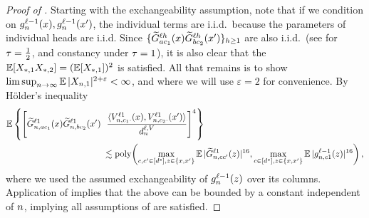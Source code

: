 \begin{proof}[Proof of ]
Starting with the exchangeability assumption, note that if we condition on ${g}^{\ell - 1}_{n}{(x)}, {g}^{\ell - 1}_{n}{(x')}$, the individual terms are i.i.d.\ because the parameters of individual heads are i.i.d.
Since $\{\widetilde{G}_{a c_1}^{\ell h} (x) \widetilde{G}_{b c_2}^{\ell h} (x')\}_{h \geq 1}$ are also i.i.d.\ (see  for $\tau  = \frac{1}{2}$, and constancy under $\tau = 1$), it is also clear that the $\operatorname*{\mathbb{E}} [ X_{*, 1} X_{*, 2} ] = (\operatorname*{\mathbb{E}} [X_{*, 1}])^2$ is satisfied.
All that remains is to show $\limsup_{n \to \infty} \operatorname*{\mathbb{E}} | X_{n, 1} |^{2 + \varepsilon} < \infty$, and where we will use $\varepsilon = 2$ for convenience.
By H{\" o}lder's inequality
\begin{align*}
    \E \left\{
        \left[
            \tildeLogitN{\sequenceVariable, \fIndexA c_1}{\depthSymbol 1}{\inputSymbol}
            \tildeLogitN{\sequenceVariable, \fIndexB c_2}{\depthSymbol 1}{\inputSymbol'}
            \vphantom{
                \frac{
                    \langle
                        \val{\sequenceVariable, c_1 \cdot}{\depthSymbol 1}(\inputSymbol) 
                        ,
                        \val{\sequenceVariable, c_2 \cdot}{\depthSymbol 1}(\inputSymbol')
                    \rangle
                }{
                    \valueDimension
                }
            }
            \right.\right.
            &
            \left.\left.
            \frac{
                \langle
                    \val{\sequenceVariable, c_1 \cdot}{\depthSymbol 1}(\inputSymbol) 
                    ,
                    \val{\sequenceVariable, c_2 \cdot}{\depthSymbol 1}(\inputSymbol')
                \rangle
            }{
                \valueDimension
            }
        \right]^4
    \right\}
    \\
    &\lesssim
    \poly \biggl(
        \max_{c, c' \in [\spatialDimension], z \in \{\inputSymbol, \inputSymbol'\}}
            \E
                |
                    \tildeLogitN{\sequenceVariable, c c'}{\depthSymbol 1}{z} 
                |^{16} 
        ,
        \max_{c \in [\spatialDimension], z \in \{\inputSymbol, \inputSymbol'\}}
            \E |
                    \indexedActivity{\depthSymbol -1}{\sequenceVariable, c 1}{z}
            |^{16}
    \biggr)
    \, ,
\end{align*}
where we used the assumed exchangeability of ${g}^{\ell-1}_{n}{(z)}$ over its columns.
Application of  implies that the above can be bounded by a constant independent of $n$, implying all assumptions of  are satisfied.
\end{proof}


